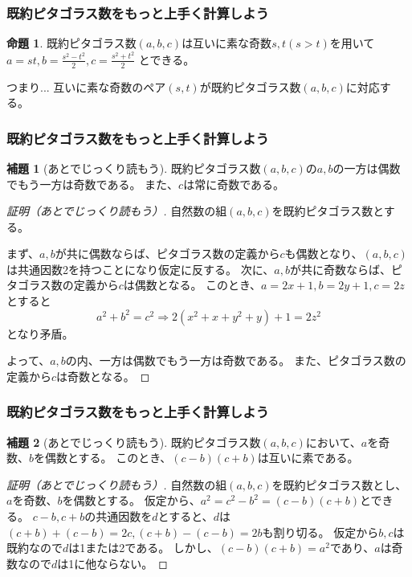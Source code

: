 \documentclass[dvipdfmx,11pt,notheorems]{beamer}
\theoremstyle{definition}
\newtheorem{proposition}{命題}
\newtheorem{lemma}{補題}
\begin{document}
\begin{frame}\frametitle{既約ピタゴラス数をもっと上手く計算しよう}

\begin{proposition}
既約ピタゴラス数$(a, b, c)$は互いに素な奇数$s, t (s > t)$を用いて 
$a = st, b = \displaystyle \frac{s^{2}-t^{2}}{2}, c = \displaystyle \frac{s^{2}+t^{2}}{2}$
とできる。
\end{proposition}

\begin{exampleblock}{つまり...}
互いに素な奇数のペア$(s, t)$が既約ピタゴラス数$(a, b, c)$に対応する。
\end{exampleblock}

\end{frame}

\begin{frame}\frametitle{既約ピタゴラス数をもっと上手く計算しよう}

\begin{lemma}[あとでじっくり読もう]
既約ピタゴラス数$(a, b, c)$の$a, b$の一方は偶数でもう一方は奇数である。
また、$c$は常に奇数である。
\end{lemma}

\begin{proof}[証明（あとでじっくり読もう）]
自然数の組$(a, b, c)$を既約ピタゴラス数とする。

まず、$a, b$が共に偶数ならば、ピタゴラス数の定義から$c$も偶数となり、$(a, b, c)$は共通因数2を持つことになり仮定に反する。
次に、$a, b$が共に奇数ならば、ピタゴラス数の定義から$c$は偶数となる。
このとき、$a = 2x + 1, b = 2y + 1, c = 2z$とすると
\begin{equation*}
a^{2} + b^{2} = c^{2} \Rightarrow 2(x^{2} + x + y^{2} + y) + 1 = 2z^{2}
\end{equation*}
となり矛盾。

よって、$a, b$の内、一方は偶数でもう一方は奇数である。
また、ピタゴラス数の定義から$c$は奇数となる。
\end{proof}

\end{frame}

\begin{frame}\frametitle{既約ピタゴラス数をもっと上手く計算しよう}
\begin{lemma}[あとでじっくり読もう]
既約ピタゴラス数$(a, b, c)$において、$a$を奇数、$b$を偶数とする。
このとき、$(c-b)(c+b)$は互いに素である。
\end{lemma}

\begin{proof}[証明（あとでじっくり読もう）]
自然数の組$(a, b, c)$を既約ピタゴラス数とし、$a$を奇数、$b$を偶数とする。
仮定から、$a^{2} = c^{2} -b^{2} = (c-b)(c+b)$とできる。
$c-b, c+b$の共通因数を$d$とすると、$d$は$(c+b)+(c-b)=2c, (c+b)-(c-b)=2b$も割り切る。
仮定から$b, c$は既約なので$d$は1または2である。
しかし、$(c-b)(c+b)=a^{2}$であり、$a$は奇数なので$d$は1に他ならない。

\end{proof}

\end{frame}
\end{document}
